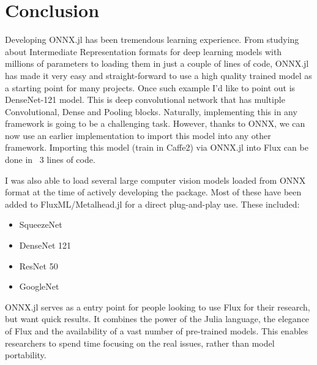 \documentclass{juliacon}
\begin{document}
\section{Conclusion}

Developing ONNX.jl has been tremendous learning experience. From studying about Intermediate Representation formats for deep 
learning models with millions of parameters to loading them in just a couple of lines of code, ONNX.jl has 
made it very easy and straight-forward to use a high quality trained model as a starting point for many projects.
Once such example I'd like to point out is DenseNet-121 model. This is deep convolutional network that has 
multiple Convolutional, Dense and Pooling blocks. Naturally, implementing this in any framework is going to be
a challenging task. However, thanks to ONNX, we can now use an earlier implementation to import this model into
any other framework. Importing this model (train in Caffe2) via ONNX.jl into Flux can be done in ~3 lines of code.
 

I was also able to load several large computer vision models loaded from ONNX format at the time of actively
developing the package. Most of these have been added to FluxML/Metalhead.jl for a direct plug-and-play use. These
included:

\begin{itemize}
    \item SqueezeNet \cite{i2016squeezenet}
    \item DenseNet 121  \cite{huang2016densely}
    \item ResNet 50     \cite{he2015deep}
    \item GoogleNet     \cite{szegedy2014going}
\end{itemize}


ONNX.jl serves as a entry point for people looking to use Flux for their research, but want quick results. It 
combines the power of the Julia language, the elegance of Flux and the availability of a vast number of pre-trained models. This enables researchers to spend time focusing on the real issues, rather than model portability. \newpage


\end{document}
